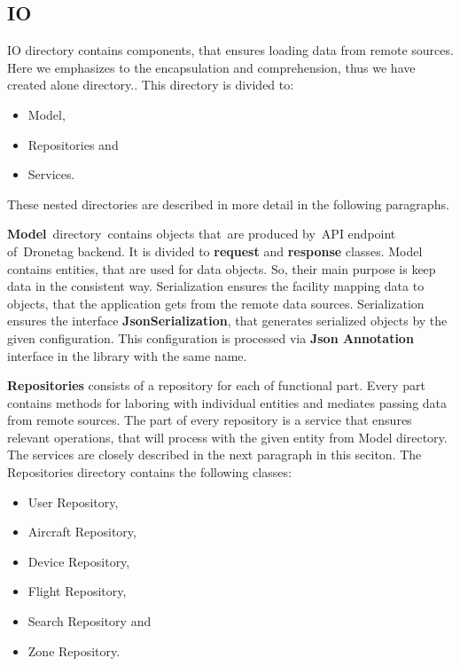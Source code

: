 \subsection{IO}\label{subsec:io}
IO directory contains components, that ensures loading data from remote sources.
Here we emphasizes to the encapsulation and comprehension, thus we have created alone directory..
This directory is divided to:
\begin{itemize}
    \item Model,
    \item Repositories and
    \item Services.
\end{itemize}
These nested directories are described in more detail in the following paragraphs.

\textbf{Model}~directory~contains objects that~are produced by~API endpoint of~Dronetag backend.
It is divided to \textbf{request} and \textbf{response} classes.
Model contains entities, that are used for data objects.
So, their main purpose is keep data in the consistent way.
Serialization ensures the facility mapping data to objects, that the application gets from the remote data sources.
Serialization ensures the interface \textbf{JsonSerialization}, that generates serialized objects by the given configuration.
This configuration is processed via \textbf{Json Annotation} interface in the library with the same name.

\textbf{Repositories} consists of a repository for each of functional part.
Every part contains methods for laboring with individual entities and mediates passing data from remote sources.
The part of every repository is a service that ensures relevant operations, that will process with the given entity from Model directory.
The services are closely described in the next paragraph in this seciton.
The Repositories directory contains the following classes:
\begin{itemize}
    \item User Repository,
    \item Aircraft Repository,
    \item Device Repository,
    \item Flight Repository,
    \item Search Repository and
    \item Zone Repository.
\end{itemize}

